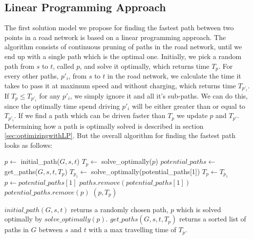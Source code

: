\subsection{Linear Programming Approach}
The first solution model we propose for finding the fastest path between two points in a road network is based on a linear programming approach. 
The algorithm consists of continuous pruning of paths in the road network, until we end up with a single path which is the optimal one. Initially, we pick a random path from $s$ to $t$, called $p$, and solve it optimally, which returns time $T_p$. For every other paths, $p'_i$, from $s$ to $t$ in the road network, we calculate the time it takes to pass it at maximum speed and without charging, which returns time $T_{p'_{i}}$. If $T_p \leq T_{p'_{i}}$ for any $p'_{i}$, we simply ignore it and all it's sub-paths. We can do this, since the optimally time spend driving $p'_i$ will be either greater than or equal to $T_{p'_{i}}$. If we find a path which can be driven faster than $T_p$ we update $p$ and $T_{p'}$. Determining how a path is optimally solved is described in section \ref{sec:optimizingwithLP}. But the overall algorithm for finding the fastest path looks as follows:\\

\begin{algorithmic}
    \State $p \gets$ initial\_path($G,s,t$) 
    \State $T_p \gets$ solve\_optimally($p$)
    \State $potential\_paths \gets$ get\_paths($G,s,t,T_p$)
    \Repeat 
    	\State $T_{p_1} \gets$ solve\_optimally(potential\_paths[1])
    		\State $T_p \gets T_{p_1}$
    		\State $p \gets potential\_paths[1]$ 
    	\EndIf  
    	\State $paths.remove(potential\_paths[1])$
    			\State $potential\_paths.remove(p)$
    		\EndIf
    	\EndFor
    \State \Return $(p, T_p)$
\EndFunction
\end{algorithmic}

$initial\_path(G,s,t)$ returns a randomly chosen path, $p$ which is solved optimally by $solve\_optimally(p)$. $get\_paths(G,s,t,T_p)$ returns a sorted list of paths in $G$ between $s$ and $t$ with a max travelling time of $T_p$.

